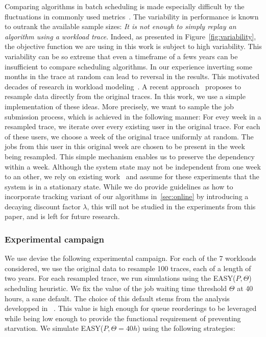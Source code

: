 \documentclass[sigconf,anonymous]{acmart}
\begin{document}
Comparing algorithms in batch scheduling is made especially difficult by the
fluctuations in commonly used metrics~\cite{jsm}. The variability in
performance is known to outrank the available sample sizes: \textit{It is not
enough to simply replay an algorithm using a workload trace}. Indeed, as
presented in Figure~\ref{fig:variability}, the objective function we are using
in this work is subject to high variability. This variability can be so extreme
that even a timeframe of a fews years can be insufficient to compare scheduling
algorithms. In our experience inverting some months in the trace at random can
lead to reversal in the results. This motivated decades of research in workload
modeling~\cite{feitbook}. A recent approach~\cite{feitresampling} proposes to
resample data directly from the original traces. In this work, we use a simple
implementation of these ideas.  More precisely, we want to sample the job
submission process, which is achieved in the following manner: For evey week in
a resampled trace, we iterate over every existing user in the original trace.
For each of these users, we choose a week of the original trace uniformly at
random. The jobs from this user in this original week are chosen to be present
in the week being resampled.  This simple mechanism enables us to preserve the
dependency within a week.  Although the system state may not be independent
from one week to an other, we rely on existing work~\cite{jsspp17} and assume
for these experiments that the system is in a stationary state. While we
do provide guidelines as how to incorporate tracking variant of our algorithms
in~\ref{sec:online} by introducing a decaying discount factor $\lambda$,
this will not be studied in the experiments from this paper, and is left for
future research.


\subsubsection{Experimental campaign}

We use devise the following experimental campaign. For each of the 7 workloads
considered, we use the original data to resample 100 traces, each of a length
of two years. For each resampled trace, we run simulations using the
EASY($P,\Theta$) scheduling heuristic. We fix the value of the job waiting time
threshold $\Theta$ at 40 hours, a sane default. The choice of this default
stems from the analysis developped in ~\cite{jsspp17}. This value is high
enough for queue reorderings to be leveraged while being low enough to provide
the functional requirement of preventing starvation. We simulate
EASY($P,\Theta=40h$) using the following strategies:
\end{document}
